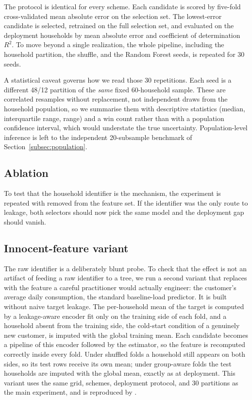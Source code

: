 \documentclass[10pt]{article}
\DeclareRobustCommand{\code}[1]{\texttt{\detokenize{#1}}}
\begin{document}
The protocol is identical for every scheme. Each candidate is scored by five-fold
cross-validated mean absolute error on the selection set. The lowest-error
candidate is selected, retrained on the full selection set, and evaluated on the
deployment households by mean absolute error and coefficient of determination
$R^2$. To move beyond a single realization, the whole pipeline, including the
household partition, the shuffle, and the Random Forest seeds, is repeated for 30
seeds.

A statistical caveat governs how we read those 30 repetitions. Each seed is a
different 48/12 partition of the \emph{same} fixed 60-household sample. These are
correlated resamples without replacement, not independent draws from the
household population, so we summarise them with descriptive statistics (median,
interquartile range, range) and a win count rather than with a population
confidence interval, which would understate the true uncertainty. Population-level
inference is left to the independent 20-subsample benchmark of Section~\ref{subsec:population}.

\subsection{Ablation}

To test that the household identifier is the mechanism, the experiment is
repeated with \code{hh_int} removed from the feature set. If the identifier was
the only route to leakage, both selectors should now pick the same model and the
deployment gap should vanish.

\subsection{Innocent-feature variant}

The raw identifier is a deliberately blunt probe. To check that the effect is not
an artifact of feeding a raw identifier to a tree, we run a second variant that
replaces \code{hh_int} with the feature a careful practitioner would actually
engineer: the customer's average daily consumption, the standard baseline-load
predictor. It is built without naive target leakage. The per-household mean of the
target is computed by a leakage-aware encoder fit only on the training side of
each fold, and a household absent from the training side, the cold-start
condition of a genuinely new customer, is imputed with the global training mean.
Each candidate becomes a pipeline of this encoder followed by the estimator, so
the feature is recomputed correctly inside every fold. Under shuffled folds a
household still appears on both sides, so its test rows receive its own mean;
under group-aware folds the test households are imputed with the global mean,
exactly as at deployment. This variant uses the same grid, schemes, deployment
protocol, and 30 partitions as the main experiment, and is reproduced by
\code{examples/selection_regret_lcl_targetenc.py}.
\end{document}
